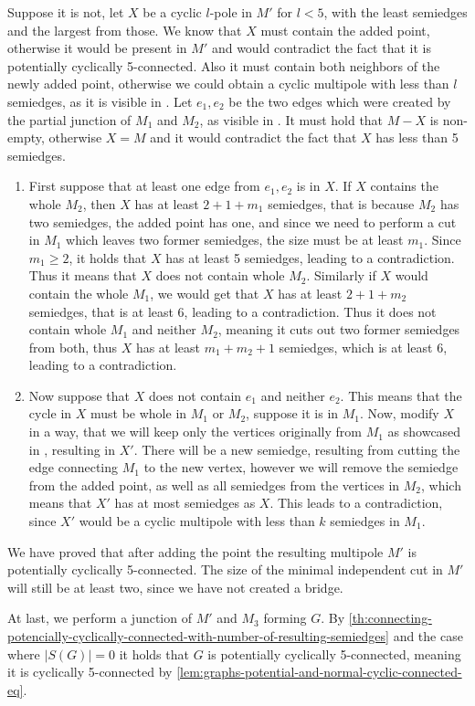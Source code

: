 \documentclass[12pt, twoside]{book}
\begin{document}
\begin{example}
	Suppose it is not, let $X$ be a cyclic $l$-pole in $M'$ for $l<5$, with the least semiedges and the largest from those. We know that $X$ must contain the added point, otherwise it would be present in $M'$ and would contradict the fact that it is potentially cyclically 5-connected. Also it must contain both neighbors of the newly added point, otherwise we could obtain a cyclic multipole with less than $l$ semiedges, as it is visible in . Let $e_1,e_2$ be the two edges which were created by the partial junction of $M_1$ and $M_2$, as visible in .  It must hold that $M-X$ is non-empty, otherwise $X=M$ and it would contradict the fact that $X$ has less than 5 semiedges.
	\begin{enumerate}
		\item First suppose that at least one edge from $e_1,e_2$ is in $X$. If $X$ contains the whole $M_2$, then $X$ has at least $2+1+m_1$ semiedges, that is because $M_2$ has two semiedges, the added point has one, and since we need to perform a cut in $M_1$ which leaves two former semiedges, the size must be at least $m_1$. Since $m_1\geq 2$, it holds that $X$ has at least 5 semiedges, leading to a contradiction. Thus it means that $X$ does not contain whole $M_2$. Similarly if $X$ would contain the whole $M_1$, we would get that $X$ has at least $2+1+m_2$ semiedges, that is at least 6, leading to a contradiction. Thus it does not contain whole $M_1$ and neither $M_2$, meaning it cuts out two former semiedges from both, thus $X$ has at least $m_1+m_2+1$ semiedges, which is at least 6, leading to a contradiction.
		\item Now suppose that $X$ does not contain $e_1$ and neither $e_2$. This means that the cycle in $X$ must be whole in $M_1$ or $M_2$, suppose it is in $M_1$. Now, modify $X$ in a way, that we will keep only the vertices originally from $M_1$ as showcased in , resulting in $X'$. There will be a new semiedge, resulting from cutting the edge connecting $M_1$ to the new vertex, however we will remove the semiedge from the added point, as well as all semiedges from the vertices in $M_2$, which means that $X'$ has at most semiedges as $X$. This leads to a contradiction, since $X'$ would be a cyclic multipole with less than $k$ semiedges in $M_1$.
	\end{enumerate}

	We have proved that after adding the point the resulting multipole $M'$ is potentially cyclically 5-connected. The size of the minimal independent cut in $M'$ will still be at least two, since we have not created a bridge.
	
	At last, we perform a junction of $M'$ and $M_3$ forming $G$. By \cref{th:connecting-potencially-cyclically-connected-with-number-of-resulting-semiedges} and the case where $|S(G)|=0$ it holds that $G$ is potentially cyclically 5-connected, meaning it is cyclically 5-connected by \cref{lem:graphs-potential-and-normal-cyclic-connected-eq}.
	
\end{example}
\end{document}
